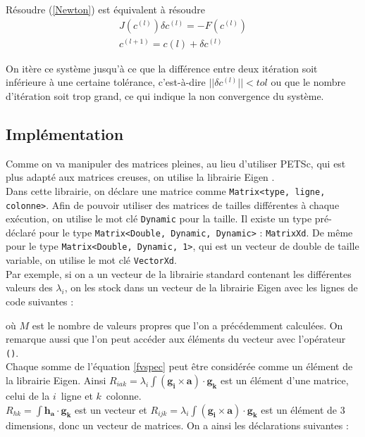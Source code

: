 Résoudre (\ref{Newton}) est équivalent à résoudre 
\begin{align}
J(c^{(l)})\delta c^{(l)} = -F(c^{(l)})\label{INewton1}\\
c^{(l+1)}=c{(l)}+\delta c^{(l)}\label{INewton2}
\end{align}

On itère ce système jusqu'à ce que la différence entre deux itération soit inférieure à une certaine tolérance, c'est-à-dire $||\delta c^{(l)}||<tol$ ou que le nombre d'itération soit trop grand, ce qui indique la non convergence du système.

\subsection{Implémentation}

Comme on va manipuler des matrices pleines, au lieu d'utiliser PETSc, qui est plus adapté aux matrices creuses, on utilise la librairie Eigen \cite{eigenweb}.\\
Dans cette librairie, on déclare une matrice comme \texttt{Matrix<type, ligne, colonne>}. Afin de pouvoir utiliser des matrices de tailles différentes à chaque exécution, on utilise le mot clé \texttt{Dynamic} pour la taille. Il existe un type pré-déclaré pour le type \texttt{Matrix<Double, Dynamic, Dynamic>} : \texttt{MatrixXd}. De même pour le type \texttt{Matrix<Double, Dynamic, 1>}, qui est un vecteur de double de taille variable, on utilise le mot clé \texttt{VectorXd}.\\

Par exemple, si on a un vecteur de la librairie standard contenant les différentes valeurs des $\lambda_i$, on les stock dans un vecteur de la librairie Eigen avec les lignes de code suivantes : 

où $M$ est le nombre de valeurs propres que l'on a précédemment calculées. On remarque aussi que l'on peut accéder aux éléments du vecteur avec l'opérateur \texttt{()}.\\

Chaque somme de l'équation \ref{fvspec} peut être considérée comme un élément de la librairie Eigen. Ainsi $R_{iak}=\lambda_i\int (\bm{g_i}\times\bm{a})\cdot\bm{g_k}$ est un élément d'une matrice, celui de la $i$\ieme\ ligne et $k$\ieme\ colonne.\\
$R_{hk} = \int \bm{h_a}\cdot\bm{g_k}$ est un vecteur et $R_{ijk} = \lambda_i\int (\bm{g_i}\times\bm{a})\cdot\bm{g_k}$ est un élément de 3 dimensions, donc un vecteur de matrices. On a ainsi les déclarations suivantes :\\


